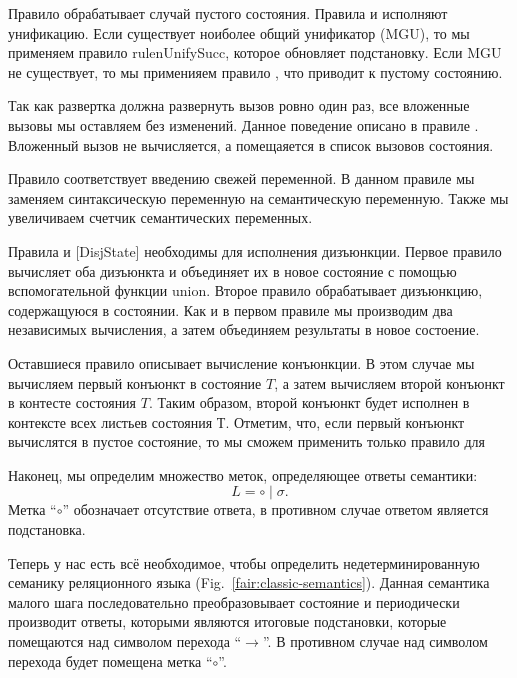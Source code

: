 Правило  обрабатывает случай пустого состояния. Правила  и  исполняют унификацию. Если существует ноиболее общий унификатор (MGU), то мы применяем правило rulen{UnifySucc}, которое обновляет подстановку. Если MGU не существует, то мы применияем правило , что приводит к пустому состоянию.

Так как развертка должна развернуть вызов ровно один раз, все вложенные вызовы мы оставляем без изменений. Данное поведение описано в правиле . Вложенный вызов не вычисляется, а помещаяется в список вызовов состояния.

Правило  соответствует введению свежей переменной. В данном правиле мы заменяем синтаксическую переменную на семантическую переменную. Также мы увеличиваем счетчик семантических переменных. 

Правила  и [DisjState] необходимы для исполнения дизъюнкции. Первое правило вычисляет оба дизъюнкта и объединяет их в новое состояние с помощью вспомогательной функции union. Второе правило обрабатывает дизъюнкцию, содержащуюся в состоянии. Как и в первом правиле мы производим два независимых вычисления, а затем объединяем результаты в новое состоение.

Оставшиеся правило  описывает вычисление конъюнкции. В этом случае мы вычисляем первый конъюнкт в состояние $T$, а затем вычисляем второй конъюнкт в контесте состояния $T$. Таким образом, второй конъюнкт будет исполнен в контексте всех листьев состояния $Т$. Отметим, что, если первый конъюнкт вычислятся в пустое состояние, то мы сможем применить только правило для 

Наконец, мы определим множество меток, определяющее ответы семантики:
\[
L = \circ \mid \sigma.
\]
Метка ``$\circ$'' обозначает отсутствие ответа, в противном случае ответом является подстановка.

Теперь у нас есть всё необходимое, чтобы определить недетерминированную семанику реляционного языка (Fig.~\ref{fair:classic-semantics}). Данная семантика малого шага последовательно преобразовывает состояние и периодически производит ответы, которыми являются итоговые подстановки, которые помещаются над символом перехода ``$\xrightarrow{}$''. В противном случае над символом перехода будет помещена метка ``$\circ$''.

